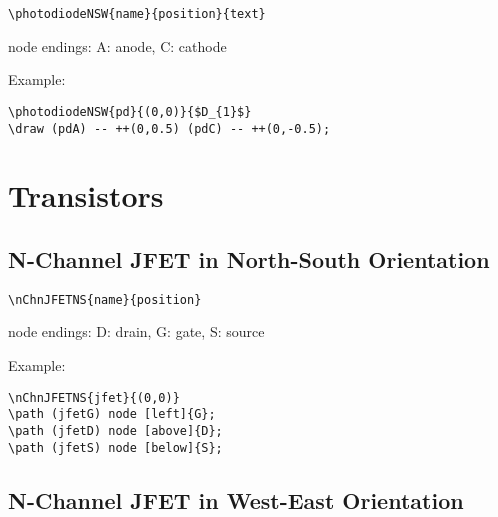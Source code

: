 \documentclass[parskip=full]{scrartcl}
\begin{document}
\begin{verbatim}
\photodiodeNSW{name}{position}{text}
\end{verbatim}
node endings: A: anode, C: cathode

Example:\\
\begin{minipage}{0.8\textwidth}
\begin{verbatim}
\photodiodeNSW{pd}{(0,0)}{$D_{1}$}
\draw (pdA) -- ++(0,0.5) (pdC) -- ++(0,-0.5);
\end{verbatim}
\end{minipage}
\begin{minipage}{0.19\textwidth}
\end{minipage}

\section{Transistors}

\subsection{N-Channel JFET in North-South Orientation}

\begin{verbatim}
\nChnJFETNS{name}{position}
\end{verbatim}
node endings: D: drain, G: gate, S: source

Example:\\
\begin{minipage}{0.8\textwidth}
\begin{verbatim}
\nChnJFETNS{jfet}{(0,0)}
\path (jfetG) node [left]{G};
\path (jfetD) node [above]{D};
\path (jfetS) node [below]{S};
\end{verbatim}
\end{minipage}
\begin{minipage}{0.19\textwidth}
\end{minipage}

\subsection{N-Channel JFET in West-East Orientation}
\end{document}
